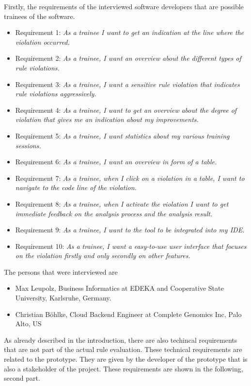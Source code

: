Firstly, the requirements of the interviewed software developers that are possible trainees of the software. 
\begin{itemize}
  \item Requirement 1: \textit{As a trainee I want to get an indication at the line where the violation occurred.}
  \item Requirement 2: \textit{As a trainee, I want an overview about the different types of rule violations.}
  \item Requirement 3: \textit{As a trainee, I want a sensitive rule violation that indicates rule violations aggressively.}
  \item Requirement 4: \textit{As a trainee, I want to get an overview about the degree of violation that gives me an indication about my improvements.}
  \item Requirement 5: \textit{As a trainee, I want statistics about my various training sessions.}
  \item Requirement 6: \textit{As a trainee, I want an overview in form of a table.}
  \item Requirement 7: \textit{As a trainee, when I click on a violation in a table, I want to navigate to the code line of the violation.}
  \item Requirement 8: \textit{As a trainee, when I activate the violation I want to get immediate feedback on the analysis process and the analysis result.}
  \item Requirement 9: \textit{As a trainee, I want to the tool to be integrated into my \ac{IDE}.}
  \item Requirement 10: \textit{As a trainee, I want a easy-to-use user interface that focuses on the violation firstly and only secondly on other features.}
\end{itemize}

The persons that were interviewed are
\begin{itemize}
  \item Max Leupolz, Business Informatics at EDEKA and Cooperative State University, Karlsruhe, Germany. 
  \item Christian Böhlke, Cloud Backend Engineer at Complete Genomics Inc, Palo Alto, US
\end{itemize}

As already described in the introduction, there are also techincal requirements that are not part of the actual rule evaluation. These technical requirements are related to the prototype. They are given by the developer of the prototype that is also a stakeholder of the project. These requirements are shown in the following, second part. 


